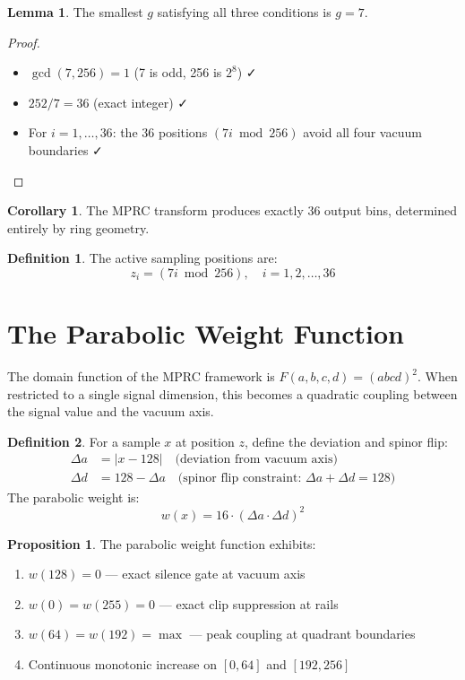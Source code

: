 \documentclass[12pt,a4paper]{article}
\theoremstyle{definition}
\newtheorem{definition}{Definition}
\newtheorem{lemma}{Lemma}
\newtheorem{corollary}{Corollary}
\newtheorem{proposition}{Proposition}
\begin{document}
\begin{lemma}
The smallest $g$ satisfying all three conditions is $g = 7$.
\end{lemma}

\begin{proof}
\begin{itemize}
    \item $\gcd(7, 256) = 1$ (7 is odd, 256 is $2^8$) ✓
    \item $252 / 7 = 36$ (exact integer) ✓
    \item For $i = 1, \ldots, 36$: the 36 positions $(7i \bmod 256)$ avoid all four vacuum boundaries ✓
\end{itemize}
\end{proof}

\begin{corollary}
The MPRC transform produces exactly 36 output bins, determined entirely by ring geometry.
\end{corollary}

\begin{definition}
The active sampling positions are:
\[
z_i = (7i \bmod 256), \quad i = 1, 2, \ldots, 36
\]
\end{definition}

\section{The Parabolic Weight Function}

The domain function of the MPRC framework is $F(a,b,c,d) = (abcd)^2$. When restricted to a single signal dimension, this becomes a quadratic coupling between the signal value and the vacuum axis.

\begin{definition}
For a sample $x$ at position $z$, define the deviation and spinor flip:
\begin{align}
\Delta a &= |x - 128| \quad \text{(deviation from vacuum axis)} \\
\Delta d &= 128 - \Delta a \quad \text{(spinor flip constraint: $\Delta a + \Delta d = 128$)}
\end{align}
The parabolic weight is:
\[
w(x) = 16 \cdot (\Delta a \cdot \Delta d)^2
\]
\end{definition}

\begin{proposition}
The parabolic weight function exhibits:
\begin{enumerate}
    \item $w(128) = 0$ — exact silence gate at vacuum axis
    \item $w(0) = w(255) = 0$ — exact clip suppression at rails
    \item $w(64) = w(192) = \max$ — peak coupling at quadrant boundaries
    \item Continuous monotonic increase on $[0, 64]$ and $[192, 256]$
\end{enumerate}
\end{proposition}
\end{document}
